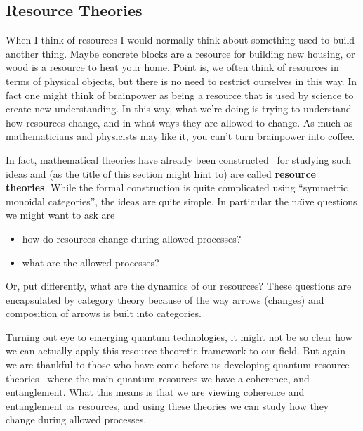 \documentclass[11pt]{article}
\theoremstyle{definition}
\begin{document}
\subsection{Resource Theories}
When I think of resources I would normally think about something used to build another thing. Maybe concrete blocks are a resource for building new housing, or wood is a resource to heat your home. Point is, we often think of resources in terms of physical objects, but there is no need to restrict ourselves in this way. In fact one might think of brainpower as being a resource that is used by science to create new understanding. In this way, what we're doing is trying to understand how resources change, and in what ways they are allowed to change. As much as mathematicians and physicists may like it, you can't turn brainpower into coffee.

In fact, mathematical theories have already been constructed~\cite{mathematical-resources,resource-theory} for studying such ideas and (as the title of this section might hint to) are called \textbf{resource theories}. While the formal construction is quite complicated using ``symmetric monoidal categories'', the ideas are quite simple. In particular the na\"\i ve questions we might want to ask are
\begin{itemize}
	\item how do resources change during allowed processes?
	\item what are the allowed processes?
\end{itemize}
Or, put differently, what are the dynamics of our resources? These questions are encapsulated by category theory because of the way arrows (changes) and composition of arrows is built into categories.

Turning out eye to emerging quantum technologies, it might not be so clear how we can actually apply this resource theoretic framework to our field. But again we are thankful to those who have come before us developing quantum resource theories~\cite{quantum-resources} where the main quantum resources we have a coherence, and entanglement. What this means is that we are viewing coherence and entanglement as resources, and using these theories we can study how they change during allowed processes.
\end{document}
